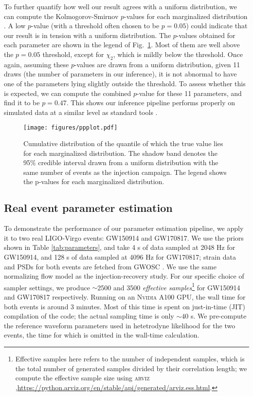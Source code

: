 \documentclass[twocolumn]{aastex631}
\begin{document}
To further quantify how well our result agrees with a uniform distribution, we
can compute the Kolmogorov-Smirnov $p$-values for each marginalized
distribution \cite{}.  A low $p$-value (with a threshold often
chosen to be $p = 0.05$) could indicate that our result is in tension with a uniform
distribution. The $p$-values obtained for each parameter are shown in the
legend of Fig.~\ref{fig:ppplot}. Most of them are well above the $p = 0.05$
threshold, except for $\chi_2$, which is mildly below the threshold. Once
again, assuming these $p$-values are drawn from a uniform distribution, given
11 draws (the number of parameters in our inference), it is not abnormal to
have one of the parameters lying slightly outside the threshold. To assess
whether this is expected, we can compute the combined $p$-value for these 11
parameters, and find it to be $p = 0.47$.  This shows our inference pipeline
performs properly on simulated data at a similar level as standard tools
\cite{Veitch:2014wba,Romero-Shaw:2020owr}.

\begin{figure}
    \texttt{[image: figures/ppplot.pdf]}
    \caption{Cumulative distribution of the quantile of which the true value
    lies for each marginalized distribution. The shadow band denotes the 95\%
    credible interval drawn from a uniform distribution with the same number of
    events as the injection campaign. The legend shows the p-values for each
    marginalized distribution.}
    \label{fig:ppplot}
\end{figure}

\subsection{Real event parameter estimation}

To demonstrate the performance of our parameter estimation pipeline, we apply
it to two real LIGO-Virgo events: GW150914 and GW170817. We use the priors
shown in Table \ref{tab:parameters}, and take 4 s of data sampled at 2048 Hz
for GW150914, and 128 s of data sampled at 4096 Hz for GW170817; strain data
and PSDs for both events are fetched from GWOSC \cite{GWOSC}. We use the same
normalizing flow model as the injection-recovery study. For our specific choice
of sampler settings, we produce ${\sim}$2500 and 3500 \emph{effective
samples}\footnote{Effective samples here refers to the number of independent
samples, which is the total number of generated samples divided by their
correlation length; we compute the effective sample size using \textsc{arviz}
\cite{arviz_2019},\url{https://python.arviz.org/en/stable/api/generated/arviz.ess.html}.
} for GW150914 and GW170817 respectively. Running on an \textsc{Nvidia} A100
GPU, the wall time for both events is around 3 minutes. Most of this time is
spent on just-in-time (JIT) compilation of the code; the actual sampling time is
only ${\sim}40$ s. We pre-compute the reference waveform parameters used in
hetetrodyne likelihood for the two events, the time for which is omitted in the
wall-time calculation.
\end{document}
